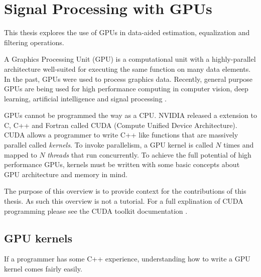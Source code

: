

\chapter{Signal Processing with GPUs}
\label{sec:gpu}

This thesis explores the use of GPUs in data-aided estimation, equalization and filtering operations.

A Graphics Processing Unit (GPU) is a computational unit with a highly-parallel architecture well-suited for executing the same function on many data elements.
In the past, GPUs were used to process graphics data.
Recently, general purpose GPUs are being used for high performance computing in computer vision, deep learning, artificial intelligence and signal processing \cite{wikipedia-gpu:2015}.

GPUs cannot be programmed the way as a CPU. 
NVIDIA released a extension to C, C++ and Fortran called CUDA (Compute Unified Device Architecture).
CUDA allows a programmer to write C++ like functions that are massively parallel called \textit{kernels}.
To invoke parallelism, a GPU kernel is called $N$ times and mapped to $N$ \textit{threads} that run concurrently.
To achieve the full potential of high performance GPUs, kernels must be written with some basic concepts about GPU architecture and memory in mind.

The purpose of this overview is to provide context for the contributions of this thesis.
As such this overview is not a tutorial.
For a full explination of CUDA programming please see the CUDA toolkit documentation \cite{CUDA_toolkit_doc}.

\section{GPU kernels}
If a programmer has some C++ experience, understanding how to write a GPU kernel comes fairly easily.


